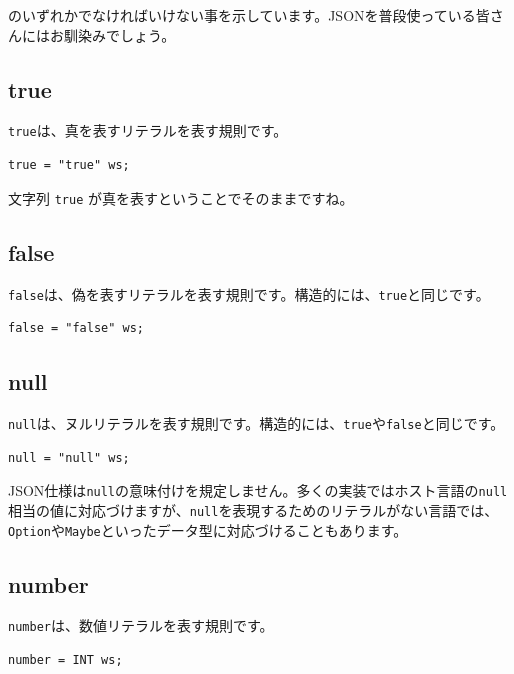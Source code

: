 のいずれかでなければいけない事を示しています。JSONを普段使っている皆さんにはお馴染みでしょう。

\hypertarget{chapter3-true}{%
\subsection{true}\label{chapter3-true}}

\texttt{true}は、真を表すリテラルを表す規則です。

\begin{verbatim}
true = "true" ws;
\end{verbatim}

文字列 \texttt{true} が真を表すということでそのままですね。

\hypertarget{chapter3-false}{%
\subsection{false}\label{chapter3-false}}

\texttt{false}は、偽を表すリテラルを表す規則です。構造的には、\texttt{true}と同じです。

\begin{verbatim}
false = "false" ws;
\end{verbatim}

\hypertarget{chapter3-null-1}{%
\subsection{null}\label{chapter3-null-1}}

\texttt{null}は、ヌルリテラルを表す規則です。構造的には、\texttt{true}や\texttt{false}と同じです。

\begin{verbatim}
null = "null" ws;
\end{verbatim}

JSON仕様は\texttt{null}の意味付けを規定しません。多くの実装ではホスト言語の\texttt{null}相当の値に対応づけますが、\texttt{null}を表現するためのリテラルがない言語では、\texttt{Option}や\texttt{Maybe}といったデータ型に対応づけることもあります。

\hypertarget{chapter3-number}{%
\subsection{number}\label{chapter3-number}}

\texttt{number}は、数値リテラルを表す規則です。

\begin{verbatim}
number = INT ws;
\end{verbatim}

